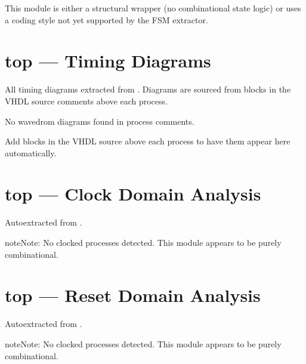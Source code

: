 \documentclass[letterpaper,10pt,english]{sphinxmanual}
\begin{document}
\sphinxAtStartPar
This module is either a structural wrapper (no combinational
state logic) or uses a coding style not yet supported by the
FSM extractor.

\sphinxstepscope


\section{top — Timing Diagrams}
\label{\detokenize{modules/top/timing:top-timing-diagrams}}\label{\detokenize{modules/top/timing::doc}}
\sphinxAtStartPar
All timing diagrams extracted from .
Diagrams are sourced from  blocks in the VHDL
source comments above each process.

\sphinxAtStartPar
No wavedrom diagrams found in process comments.

\sphinxAtStartPar
Add  blocks in the VHDL source above each
process to have them appear here automatically.

\sphinxstepscope


\section{top — Clock Domain Analysis}
\label{\detokenize{modules/top/cdc:top-clock-domain-analysis}}\label{\detokenize{modules/top/cdc::doc}}
\sphinxAtStartPar
Auto\sphinxhyphen{}extracted from .

\begin{sphinxadmonition}{note}{Note:}
\sphinxAtStartPar
No clocked processes detected. This module appears to be purely combinational.
\end{sphinxadmonition}

\sphinxstepscope


\section{top — Reset Domain Analysis}
\label{\detokenize{modules/top/reset:top-reset-domain-analysis}}\label{\detokenize{modules/top/reset::doc}}
\sphinxAtStartPar
Auto\sphinxhyphen{}extracted from .

\begin{sphinxadmonition}{note}{Note:}
\sphinxAtStartPar
No clocked processes detected. This module appears to be purely combinational.
\end{sphinxadmonition}
\end{document}
